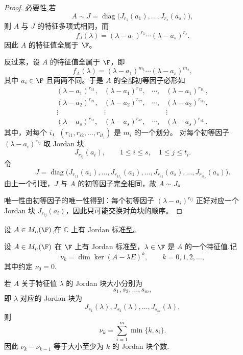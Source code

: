 \begin{proof}
	必要性,若
	\[
	A\sim J=\operatorname{diag}\bigl(J_{r_1}(a_1),\ldots,J_{r_s}(a_s)\bigr),
	\]
	则 $A$ 与 $J$ 的特征多项式相同，而
	\[
	f_J(\lambda)=(\lambda-a_1)^{r_1}\cdots(\lambda-a_s)^{r_s}.
	\]
	因此 $A$ 的特征值全属于 $\F$。
	
	反过来，设 $A$ 的特征值全属于 $\F$，即
	\[
	f_A(\lambda)=(\lambda-a_1)^{m_1}\cdots(\lambda-a_s)^{m_s},
	\]
	其中 $a_i\in\F$ 且两两不同。于是 $A$ 的全部初等因子必形如
	\[
	\begin{array}{cccc}
		(\lambda-a_1)^{r_{11}},&
		(\lambda-a_1)^{r_{12}},&
		\cdots,&
		(\lambda-a_1)^{r_{1t_1}},\\
		(\lambda-a_2)^{r_{21}},&
		(\lambda-a_2)^{r_{22}},&
		\cdots,&
		(\lambda-a_2)^{r_{2t_2}},\\
		\vdots&\vdots&&\vdots\\
		(\lambda-a_s)^{r_{s1}},&
		(\lambda-a_s)^{r_{s2}},&
		\cdots,&
		(\lambda-a_s)^{r_{st_s}} .
	\end{array}
	\]
	其中，对每个 $i$，$(r_{i1},r_{i2},\ldots,r_{it_i})$ 是 $m_i$ 的一个划分。
	对每个初等因子 $(\lambda-a_i)^{r_{ij}}$ 取 Jordan 块
	\[
	J_{r_{ij}}(a_i),\qquad 1\leq i\leq s,\quad 1\leq j\leq t_i.
	\]
	令
	\[
	J=\operatorname{diag}\bigl(
	J_{r_{11}}(a_1),\ldots,J_{r_{1t_1}}(a_1),
	\ldots,
	J_{r_{s1}}(a_s),\ldots,J_{r_{st_s}}(a_s)
	\bigr).
	\]
	由上一个引理，$J$ 与 $A$ 的初等因子完全相同，故 $A\sim J$。
	
	唯一性由初等因子的唯一性得到：每个初等因子
	$(\lambda-a_i)^{r_{ij}}$ 正好对应一个 Jordan 块
	$J_{r_{ij}}(a_i)$，因此只可能交换对角块的顺序。
\end{proof}

\begin{corollary}
	设 $A\in M_n(\F)$,在 $\mathbb C$ 上有 Jordan 标准型。
\end{corollary}
\begin{proposition}
	设 $A\in M_n(\F)$ 在 $\F$ 上有 Jordan 标准型，$\lambda\in\F$ 是 $A$ 的一个特征值.记
	\[
	\nu_k=\dim\ker(A-\lambda E)^k,\qquad k=0,1,2,\ldots,
	\]
	其中约定 $\nu_0=0$.
	
	若 $A$ 关于特征值 $\lambda$ 的 Jordan 块大小分别为
	\[
	s_1,s_2,\ldots,s_m,
	\]
	即 $\lambda$ 对应的 Jordan 块为
	\[
	J_{s_1}(\lambda),J_{s_2}(\lambda),\ldots,J_{s_m}(\lambda),
	\]
	则
	\[
	\nu_k=\sum_{i=1}^m \min\{k,s_i\}.
	\]
	因此
$\nu_k-\nu_{k-1}$ 等于大小至少为 $k$ 的 Jordan 块个数.
	
\end{proposition}

